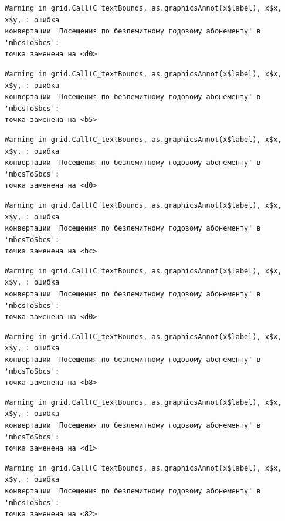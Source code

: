 \documentclass[
  letterpaper,
  DIV=11,
  numbers=noendperiod]{scrreprt}
\begin{document}
\begin{verbatim}
Warning in grid.Call(C_textBounds, as.graphicsAnnot(x$label), x$x, x$y, : ошибка
конвертации 'Посещения по безлемитному годовому абонементу' в 'mbcsToSbcs':
точка заменена на <d0>
\end{verbatim}

\begin{verbatim}
Warning in grid.Call(C_textBounds, as.graphicsAnnot(x$label), x$x, x$y, : ошибка
конвертации 'Посещения по безлемитному годовому абонементу' в 'mbcsToSbcs':
точка заменена на <b5>
\end{verbatim}

\begin{verbatim}
Warning in grid.Call(C_textBounds, as.graphicsAnnot(x$label), x$x, x$y, : ошибка
конвертации 'Посещения по безлемитному годовому абонементу' в 'mbcsToSbcs':
точка заменена на <d0>
\end{verbatim}

\begin{verbatim}
Warning in grid.Call(C_textBounds, as.graphicsAnnot(x$label), x$x, x$y, : ошибка
конвертации 'Посещения по безлемитному годовому абонементу' в 'mbcsToSbcs':
точка заменена на <bc>
\end{verbatim}

\begin{verbatim}
Warning in grid.Call(C_textBounds, as.graphicsAnnot(x$label), x$x, x$y, : ошибка
конвертации 'Посещения по безлемитному годовому абонементу' в 'mbcsToSbcs':
точка заменена на <d0>
\end{verbatim}

\begin{verbatim}
Warning in grid.Call(C_textBounds, as.graphicsAnnot(x$label), x$x, x$y, : ошибка
конвертации 'Посещения по безлемитному годовому абонементу' в 'mbcsToSbcs':
точка заменена на <b8>
\end{verbatim}

\begin{verbatim}
Warning in grid.Call(C_textBounds, as.graphicsAnnot(x$label), x$x, x$y, : ошибка
конвертации 'Посещения по безлемитному годовому абонементу' в 'mbcsToSbcs':
точка заменена на <d1>
\end{verbatim}

\begin{verbatim}
Warning in grid.Call(C_textBounds, as.graphicsAnnot(x$label), x$x, x$y, : ошибка
конвертации 'Посещения по безлемитному годовому абонементу' в 'mbcsToSbcs':
точка заменена на <82>
\end{verbatim}
\end{document}
